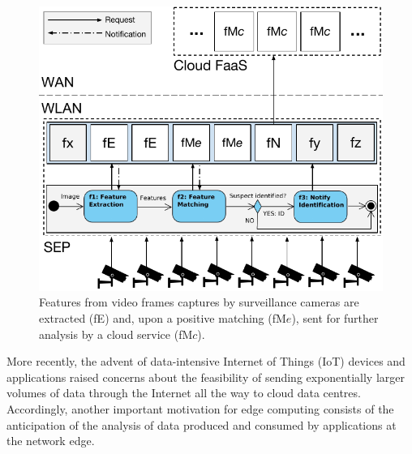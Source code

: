 \begin{figure}[tbp]
	\centering
	\includegraphics[width=\linewidth]{Figs/Edge_Data_Analytics_Video_Surveillance.pdf}
	\caption{Features from video frames captures by surveillance cameras are extracted (fE) and, upon a positive matching (fM$e$), sent for further analysis by a cloud service (fM$c$).}
	\label{fig:Edge_Data_Analytics_Video_Surveillance}
\end{figure}

More recently, the advent of data-intensive Internet of Things (IoT) devices and applications raised concerns about the feasibility of sending exponentially larger volumes of data through the Internet all the way to cloud data centres. Accordingly, another important motivation for edge computing consists of the anticipation of the analysis of data produced and consumed by applications at the network edge. 


